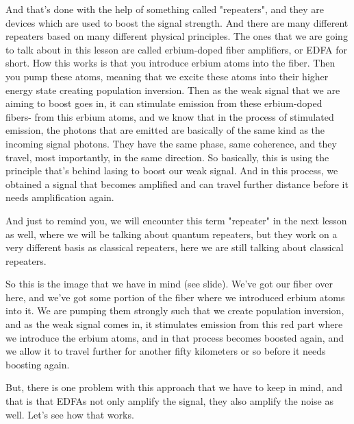 And that's done with the help of something called "repeaters", and they are devices which are used to boost the signal strength. And there are many different repeaters based on many different physical principles. The ones that we are going to talk about in this lesson are called erbium-doped fiber amplifiers, or EDFA for short. How this works is that you introduce erbium atoms into the fiber. Then you pump these atoms, meaning that we excite these atoms into their higher energy state creating population inversion. Then as the weak signal that we are aiming to boost goes in, it can stimulate emission from these erbium-doped fibers- from this erbium atoms, and we know that in the process of stimulated emission, the photons that are emitted are basically of the same kind as the incoming signal photons. They have the same phase, same coherence, and they travel, most importantly, in the same direction. So basically, this is using the principle that's behind lasing to boost our weak signal. And in this process, we obtained a signal that becomes amplified and can travel further distance before it needs amplification again.

And just to remind you, we will encounter this term "repeater" in the next lesson as well, where we will be talking about quantum repeaters, but they work on a very different basis as classical repeaters, here we are still talking about classical repeaters.

So this is the image that we have in mind (see slide). We've got our fiber over here, and we've got some portion of the fiber where we introduced erbium atoms into it. We are pumping them strongly such that we create population inversion, and as the weak signal comes in, it stimulates emission from this red part where we introduce the erbium atoms, and in that process becomes boosted again, and we allow it to travel further for another fifty kilometers or so before it needs boosting again.

But, there is one problem with this approach that we have to keep in mind, and that is that EDFAs not only amplify the signal, they also amplify the noise as well. Let's see how that works.

